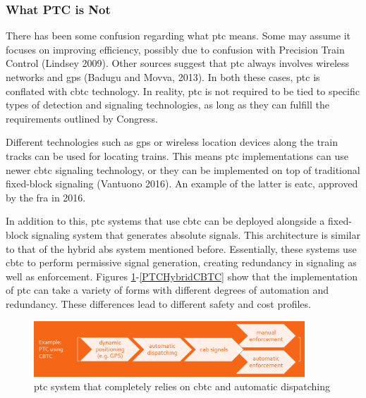 \documentclass[11pt, titlepage]{article}
\begin{document}
\subsubsection{What PTC is Not}

There has been some confusion regarding what \gls{ptc} means. Some may assume it
focuses on improving efficiency, possibly due to confusion with Precision Train
Control (Lindsey 2009). Other sources suggest that \gls{ptc} always involves
wireless networks and \gls{gps} (Badugu and Movva, 2013). In both these cases,
\gls{ptc} is conflated with \gls{cbtc} technology. In reality, \gls{ptc} is not
required to be tied to specific types of detection and signaling technologies, as
long as they can fulfill the requirements outlined by Congress.

Different technologies such as \gls{gps} or wireless location devices along the
train tracks can be used for locating trains. This means \gls{ptc} implementations
can use newer \gls{cbtc} signaling technology, or they can be implemented on top of
traditional fixed-block signaling (Vantuono 2016). An example of the latter is
\gls{eatc}, approved by the \gls{fra} in 2016.

In addition to this, \gls{ptc} systems that use \gls{cbtc} can be deployed alongside
a fixed-block signaling system that generates absolute signals. This architecture is
similar to that of the hybrid \gls{abs} system mentioned before. Essentially, these
systems use \gls{cbtc} to perform permissive signal generation, creating redundancy
in signaling as well as enforcement. Figures \ref{PTCwithCBTC}-\ref{PTCHybridCBTC}
show that the implementation of \gls{ptc} can take a variety of forms with
different degrees of automation and redundancy. These differences lead to different
safety and cost profiles.

\begin{figure}[ht]
    \begin{center}
        \includegraphics[width=4in]{PTCwithCBTC.png}
        \caption[PTC with CBTC]{\gls{ptc} system that completely relies on \gls{cbtc}
        and automatic dispatching}
        \label{PTCwithCBTC}
    \end{center}
\end{figure}
\end{document}

